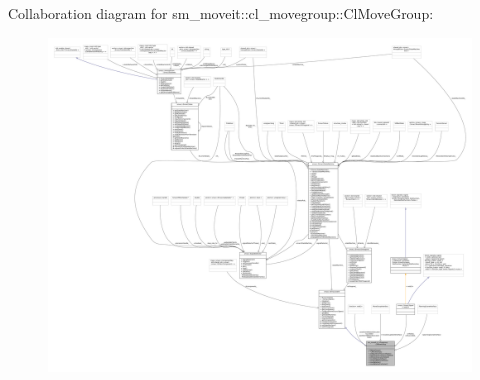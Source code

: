 Collaboration diagram for sm\+\_\+moveit\+:\+:cl\+\_\+movegroup\+:\+:Cl\+Move\+Group\+:
\nopagebreak
\begin{figure}[H]
\begin{center}
\leavevmode
\includegraphics[width=350pt]{classsm__moveit_1_1cl__movegroup_1_1ClMoveGroup__coll__graph}
\end{center}
\end{figure}
